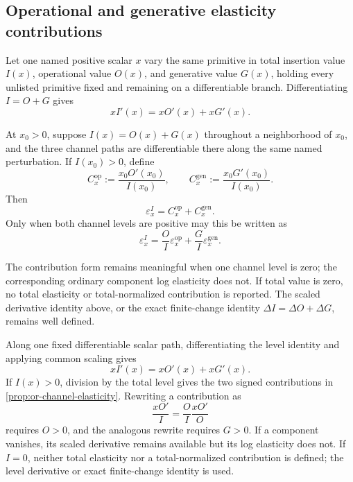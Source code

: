 \subsection{Operational and generative elasticity contributions}

Let one named positive scalar \(x\) vary the same primitive in total insertion
value \(I(x)\), operational value \(O(x)\), and generative value \(G(x)\),
holding every unlisted primitive fixed and remaining on a differentiable
branch. Differentiating \(I=O+G\) gives
\[
 xI'(x)=xO'(x)+xG'(x).
\]

\begin{proposition}
\label{prop:or-channel-elasticity}
At \(x_0>0\), suppose \(I(x)=O(x)+G(x)\) throughout a neighborhood of
\(x_0\), and the three channel paths are differentiable there along the same
named perturbation. If \(I(x_0)>0\), define
\[
 C_x^{\mathrm{op}}:=\frac{x_0O'(x_0)}{I(x_0)},
 \qquad
 C_x^{\mathrm{gen}}:=\frac{x_0G'(x_0)}{I(x_0)}.
\]
Then
\[
 \varepsilon_x^I=C_x^{\mathrm{op}}+C_x^{\mathrm{gen}}.
\]
Only when both channel levels are positive may this be written as
\[
 \varepsilon_x^I
 =\frac{O}{I}\varepsilon_x^{\mathrm{op}}
  +\frac{G}{I}\varepsilon_x^{\mathrm{gen}}.
\]
\end{proposition}

The contribution form remains meaningful when one channel level is zero; the
corresponding ordinary component log elasticity does not. If total value is
zero, no total elasticity or total-normalized contribution is reported. The
scaled derivative identity above, or the exact finite-change identity
\(\Delta I=\Delta O+\Delta G\), remains well defined.

Along one fixed differentiable scalar path, differentiating the level identity
and applying common scaling gives
\[
 xI'(x)=xO'(x)+xG'(x).
\]
If \(I(x)>0\), division by the total level gives the two signed contributions
in \cref{prop:or-channel-elasticity}. Rewriting a contribution as
\[
 \frac{xO'}I=\frac OI\frac{xO'}O
\]
requires \(O>0\), and the analogous rewrite requires \(G>0\). If a component
vanishes, its scaled derivative remains available but its log elasticity does
not. If \(I=0\), neither total elasticity nor a total-normalized contribution
is defined; the level derivative or exact finite-change identity is used.

\begin{table}[ht]
\centering
\scriptsize
\setlength{\tabcolsep}{2.5pt}

\caption{Exact productive value, channel levels, and fixed-policy discount
elasticity in the canonical benchmark. A dash marks an undefined ordinary
component elasticity at a zero component level; it is never recorded as
zero. Scaled contributions are evaluated directly.}
\label{tab:or-canonical-channel-elasticities}
\end{table}

